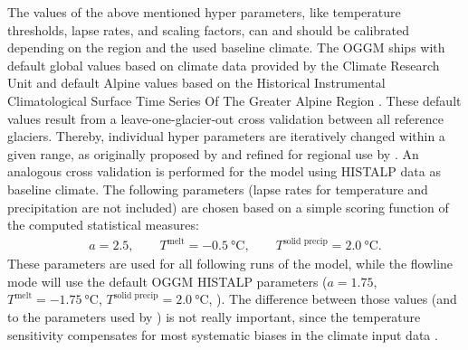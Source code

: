 
        The values of the above mentioned hyper parameters, like temperature thresholds, lapse rates, and scaling factors, can and should be calibrated depending on the region and the used baseline climate. The OGGM ships with default global values based on climate data provided by the Climate Research Unit \citep[CRU,][]{Harris2014} and default Alpine values based on the Historical Instrumental Climatological Surface Time Series Of The Greater Alpine Region \citep[HISTALP, ][]{Auer2007}. These default values result from a leave-one-glacier-out cross validation between all reference glaciers. Thereby, individual hyper parameters are iteratively changed within a given range, as originally proposed by \citet{Marzeion2012b} and refined for regional use by \citet{Dusch2018}. An analogous cross validation is performed for the \vas{} model using HISTALP data as baseline climate. The following parameters (lapse rates for temperature and precipitation are not included) are chosen based on a simple scoring function of the computed statistical measures:
        \begin{align*}
            a = 2.5, \qquad T^\text{melt} = \SI{-0.5}{\celsius}, \qquad T^\text{solid precip} = \SI{2.0}{\celsius}.
        \end{align*} 
        These parameters are used for all following runs of the \vas{} model, while the flowline mode will use the default  OGGM HISTALP parameters ($a = 1.75$, $T^\text{melt} = \SI{-1.75}{\celsius}$, $T^\text{solid precip} = \SI{2.0}{\celsius}$, \citet{Dusch2018}). The difference between those values (and to the parameters used by \citet{Marzeion2012b}) is not really important, since the temperature sensitivity \mustar{} compensates for most systematic biases in the climate input data \citep[Appendix A]{Maussion2019}. 


